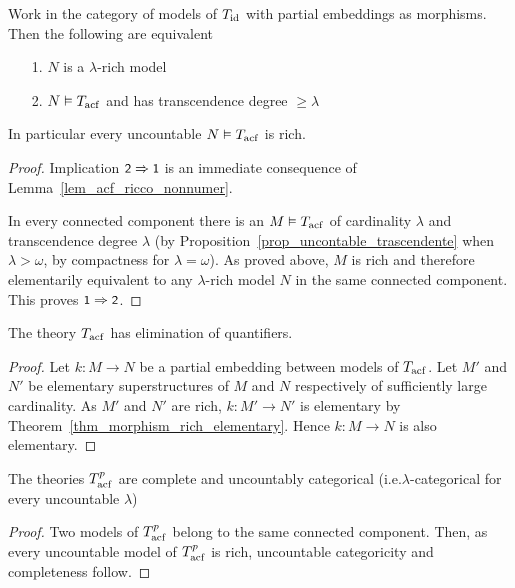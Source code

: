 \begin{corollary}\label{corol_acfUltraOmog}
Work in the category of models of $T_{\rm id}$ with partial embeddings as morphisms. Then the following are equivalent
%
\begin{itemize}
\item[1.] $N$ is a $\lambda$-rich model
\item[2.] $N\models T_{\rm acf}$ and has transcendence degree $\ge\lambda$
\end{itemize}
In particular every uncountable $N\models T_{\rm acf}$ is rich.
\end{corollary}
\begin{proof}
Implication $\ssf{2}\IMP\ssf{1}$ is an immediate consequence of Lemma~\ref{lem_acf_ricco_nonnumer}.

In every connected component there is an $M\models T_{\rm acf}$ of cardinality $\lambda$ and transcendence degree $\lambda$ (by Proposition~\ref{prop_uncontable_trascendente} when $\lambda>\omega$, by compactness for $\lambda=\omega$).
%
As proved above, $M$ is rich and therefore elementarily equivalent to any $\lambda$-rich model $N$ in the same connected component.
%
This proves $\ssf{1}\IMP\ssf{2}$.
\end{proof}

\begin{corollary}\label{corol_QE_acf}
The theory $T_{\rm acf}$ has elimination of quantifiers.
\end{corollary}

\begin{proof}
Let $k:M\to N$ be a partial embedding between models of $T_{\rm acf}$.
%
Let $M'$ and $N'$ be elementary superstructures of $M$ and $N$ respectively of sufficiently large cardinality.
%
As $M'$ and $N'$ are rich, $k:M'\to N'$ is elementary by Theorem~\ref{thm_morphism_rich_elementary}.
%
Hence $k:M\to N$ is also elementary.
\end{proof}

\begin{corollary}
The theories $T^p_{\rm acf}$ are complete and uncountably categorical (i.e.\@ $\lambda$-cate\-gori\-cal for every uncountable $\lambda$)
\end{corollary}
\begin{proof}
Two models of $T^p_{\rm acf}$ belong to the same connected component.
%
Then, as every uncountable model of $T^p_{\rm acf}$ is rich, uncountable categoricity and completeness follow.
\end{proof}

